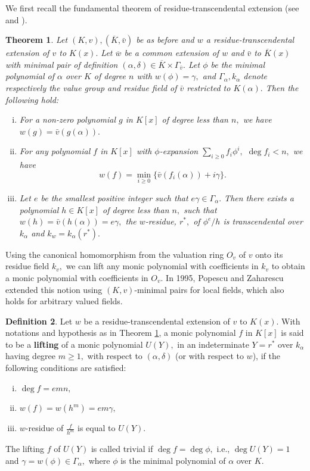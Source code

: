 \documentclass[11pt]{amsart}
\newtheorem{theorem}{Theorem}[section]
\theoremstyle{definition}
\newtheorem{definition}[theorem]{Definition}
\theoremstyle{remark}
\numberwithin{equation}{section}
\begin{document}
	We first recall the fundamental theorem of residue-transcendental extension (see \cite[Theorem2.1]{APZ1} and \cite[Theorem 1.4]{SK}).
	\begin{theorem}\label{dpth1}
Let $(K,v), (\overline{K},\bar{v})$ be as before and $w$ a residue-transcendental extension of $v$ to $K(x).$  Let $\overline{w}$ be a common extension of $w$ and $\bar{v}$ to $\overline{K}(x)$ with  minimal pair of definition $(\alpha,\delta)\in\overline{K}\times \Gamma_{\bar{v}}.$ Let $\phi$ be the minimal polynomial of $\alpha$ over $K$ of degree  $n$ with $w(\phi)=\gamma,$ and $\Gamma_\alpha, k_\alpha$ denote respectively the value group and residue field of $\bar{v}$ restricted to $K(\alpha).$ Then the following hold:
\begin{enumerate}[(i)]
	\item For a non-zero polynomial  $g$  in $K[x]$ of degree less than  $n,$  we have  $w(g)=\bar{v} (g(\alpha)).$
	\item For any  polynomial $f$ in $K[x]$ with  $\phi$-expansion $\sum_{i\geq 0}f_i \phi^i,$ $\deg f_i< n,$ we have 
	$$w(f)=\min_{i\geq 0}\{\bar{v}(f_i(\alpha))+i\gamma \}.$$
	\item Let $e$ be the smallest positive integer such that $e\gamma\in \Gamma_{\alpha}.$ Then there exists a polynomial $h \in K[x]$ of  degree less than $n,$ such that $w(h)=\bar{v}(h(\alpha))=e\gamma,$    the
	$w$-residue, $ r^{*},$ of $\phi^{e}/h$ is transcendental over $k_{\alpha}$ and $k_{w}=k_{\alpha}(r^*).$ 
\end{enumerate}
\end{theorem}
Using the canonical homomorphism from the valuation ring $O_v$ of $v$ onto its residue field $k_v,$ we can lift any monic polynomial  with coefficients in $k_v$ to obtain a monic polynomial with coefficients in $O_v.$ In 1995, Popescu and Zaharescu \cite{PZ} extended this notion using $(K,v)$-minimal pairs for local  fields, which also holds for arbitrary valued fields. 
\begin{definition} 
Let $w$ be a residue-transcendental extension of $v$ to $K(x).$ With notations and hypothesis as in Theorem \ref{dpth1}, a monic  polynomial $f$ in $K[x]$ is said to be a {\bf lifting} of a monic polynomial $U(Y),$ in an indeterminate $Y=r^*$ over $k_\alpha$ having degree $m\geq 1,$ with respect to $(\alpha,\delta)$ (or with respect to $w$), if the following conditions are satisfied:
\begin{enumerate}[(i)]
	\item $\deg f=emn,$
	\item $w(f)=w(h^{m})=em\gamma,$
	\item $w$-residue of $\frac{f}{h^m}$ is equal to $U(Y).$ 
\end{enumerate}
\end{definition}
The lifting $f$ of $U(Y)$ is called trivial if  $\deg f=\deg \phi,$ i.e., $\deg U(Y)=1$ and $\gamma=w(\phi)\in\Gamma_\alpha,$ where $\phi$ is the minimal polynomial of $\alpha$ over $K.$
\end{document}
